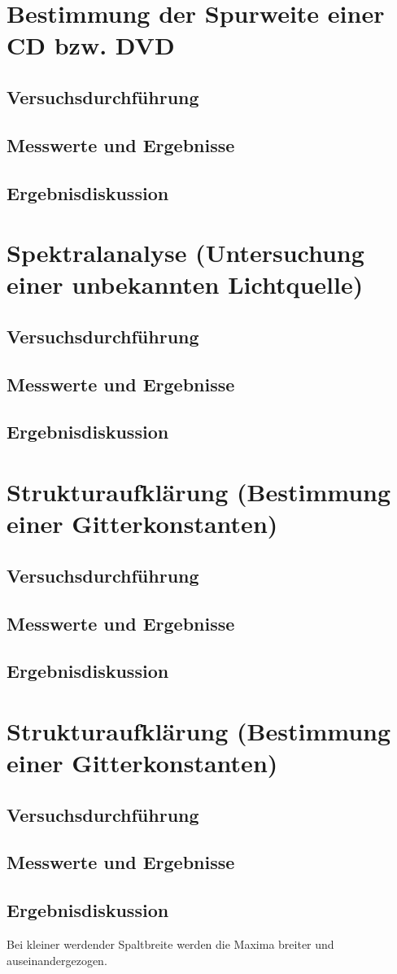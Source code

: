 \documentclass{scrartcl}
\begin{document}
\section{Bestimmung der Spurweite einer CD bzw. DVD}
\subsection{Versuchsdurchführung}
\subsection{Messwerte und Ergebnisse}
\subsection{Ergebnisdiskussion}

\section{Spektralanalyse (Untersuchung einer unbekannten Lichtquelle)}
\subsection{Versuchsdurchführung}
\subsection{Messwerte und Ergebnisse}
\subsection{Ergebnisdiskussion}

\section{Strukturaufklärung (Bestimmung einer Gitterkonstanten)}
\subsection{Versuchsdurchführung}
\subsection{Messwerte und Ergebnisse}
\subsection{Ergebnisdiskussion}

\section{Strukturaufklärung (Bestimmung einer Gitterkonstanten)}
\subsection{Versuchsdurchführung}
\subsection{Messwerte und Ergebnisse}
\subsection{Ergebnisdiskussion}
Bei kleiner werdender Spaltbreite werden die Maxima breiter und auseinandergezogen.
\end{document}
